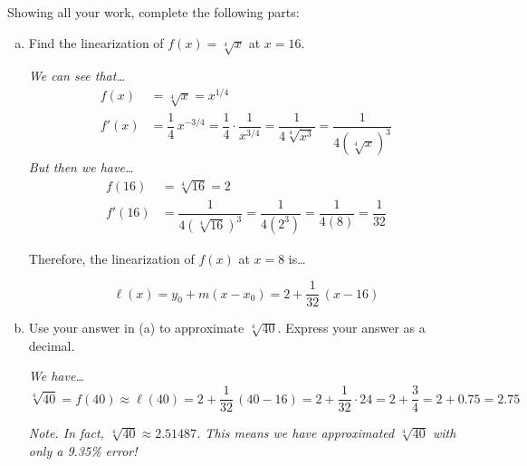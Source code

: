 \documentclass[12pt,letterpaper]{exam}
\begin{document}
\begin{questions}
\newpage
\question[16] Showing all your work, complete the following parts:
	\begin{enumerate}[(a)]
	\item Find the linearization of $f(x)= \sqrt[4]{x}$ at $x= 16$. \pspace
	
		{\itshape We can see that\dots
		\[
		\begin{aligned}
		f(x)&= \sqrt[4]{x}= x^{1/4} \\[0.3cm]
		f'(x)&= \dfrac{1}{4}\, x^{-3/4}= \dfrac{1}{4} \cdot \dfrac{1}{x^{3/4}}= \dfrac{1}{4 \sqrt[4]{x^3}}= \dfrac{1}{4 (\sqrt[4]{x})^3}
		\end{aligned}
		\]
	But then we have\dots
		\[
		\begin{aligned}
		f(16)&=\sqrt[4]{16}= 2 \\[0.3cm]
		f'(16)&= \dfrac{1}{4(\sqrt[4]{16})^3}= \dfrac{1}{4(2^3)}= \dfrac{1}{4(8)}= \dfrac{1}{32}
		\end{aligned}
		\] \par\vspace{0.5cm}
	Therefore, the linearization of $f(x)$ at $x= 8$ is\dots \par\vspace{0.1cm}
		\[
		\ell(x)= y_0 + m(x - x_0)= 2 + \dfrac{1}{32} \, (x - 16) 
		\]
	} \par\vspace{2.6cm}

	\item Use your answer in (a) to approximate $\sqrt[4]{40}$. Express your answer as a decimal. \pspace
	
	{\itshape We have\dots
		\[
		\sqrt[4]{40}= f(40) \approx \ell(40)= 2 + \dfrac{1}{32} \,(40 - 16)= 2 + \dfrac{1}{32} \cdot 24= 2 + \dfrac{3}{4}= 2 + 0.75= 2.75
		\]
	} \vfill
	
	{\itshape\footnotesize Note. In fact, $\sqrt[4]{40} \approx 2.51487$. This means we have approximated $\sqrt[4]{40}$ with only a 9.35\% error!}
	\end{enumerate}

\end{questions}
\end{document}
